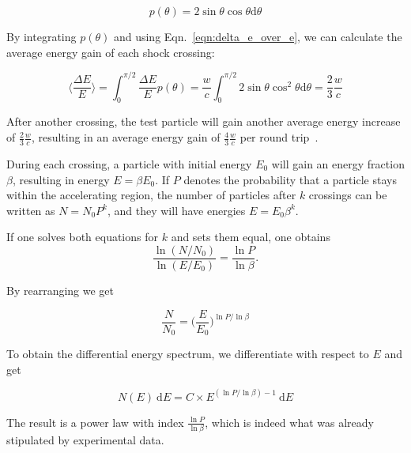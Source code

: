 \begin{equation}
    p(\theta) = 2\sin{\theta}\cos{\theta} \text{d}\theta
\end{equation}

By integrating $p(\theta)$ and using Eqn.~\ref{eqn:delta_e_over_e}, we can calculate the average energy gain of each shock crossing:

\begin{equation}
    \bigg\langle \frac{\Delta E}{E} \bigg\rangle = \int_0^{\pi/2} \frac{\Delta E}{E} p(\theta) = \frac{w}{c} \int_0^{\pi/2} 2 \sin{\theta} \cos^2{\theta}  \text{d}\theta = \frac{2}{3}\frac{w}{c}
\end{equation}

After another crossing, the test particle will gain another average energy increase of $\frac{2}{3}\frac{w}{c}$, resulting in an average energy gain of $\frac{4}{3}\frac{w}{c}$ per round trip~\cite{Longair2011}.

During each crossing, a particle with initial energy $E_0$ will gain an energy fraction $\beta$, resulting in energy $E=\beta E_0$. If $P$ denotes the probability that a particle stays within the accelerating region, the number of particles after $k$ crossings can be written as $N=N_0 P^k $, and they will have energies $E=E_0\beta^k$.

If one solves both equations for $k$ and sets them equal, one obtains
\begin{equation}
    \frac{\ln (N/N_0)}{\ln (E/E_0)} = \frac{\ln P}{\ln \beta}.
\end{equation}

By rearranging we get

\begin{equation}
    \frac{N}{N_0} = \bigg(\frac{E}{E_0}\bigg)^{\ln P / \ln \beta}
\end{equation}

To obtain the differential energy spectrum, we differentiate with respect to $E$ and get

\begin{equation}
    \label{eqn:diff_e_spec}
    N(E)~\text{d} E = C\times E^{(\ln P/\ln\beta)-1}~\text{d} E
\end{equation}

The result is a power law with index $\frac{\ln P}{\ln \beta}$, which is indeed what was already stipulated by experimental data.

